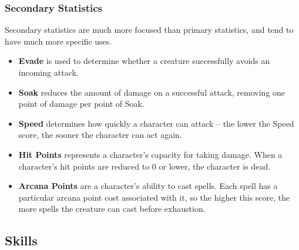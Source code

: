 \documentclass{article}
\begin{document}
\subsubsection{Secondary Statistics}

Secondary statistics are much more focused than primary statistics, and
tend to have much more specific uses.

\begin{itemize}
\item {\bf Evade} is used to determine whether a creature successfully
avoids an incoming attack.

\item {\bf Soak} reduces the amount of damage on a successful attack,
removing one point of damage per point of Soak.

\item {\bf Speed} determines how quickly a character can attack -- the
lower the Speed score, the sooner the character can act again.

\item {\bf Hit Points} represents a character's capacity for taking damage.
When a character's hit points are reduced to 0 or lower, the character is
dead.

\item {\bf Arcana Points} are a character's ability to cast spells.  Each
spell has a particular arcana point cost associated with it, so the higher
this score, the more spells the creature can cast before exhaustion.
\end{itemize}

\subsection{Skills}
\end{document}

